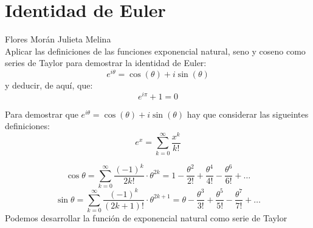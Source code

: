 \documentclass[12pt]{article}
\begin{document}
\section{Identidad de Euler} Flores Morán Julieta Melina \\

Aplicar las definiciones de las funciones exponencial natural, seno y coseno como series de Taylor para demostrar la identidad de Euler:
\[e^{i\theta} = \cos(\theta) + i \sin(\theta)\]
y deducir, de aquí, que:
\[e^{i\pi} + 1 = 0\]

Para demostrar que $e^{i\theta} = \cos(\theta) + i \sin(\theta)$ hay que considerar las sigueintes definiciones:
\[
e^x = \sum_{k=0}^{\infty}\frac{x^{k}}{k!}
\]

\[
\cos\theta = \sum_{k=0}^{\infty}\frac{(-1)^{k}}{2k!} \cdot \theta ^{2k} = 1- \frac{\theta^2}{2!} + \frac{\theta ^4}{4!} -   \frac{\theta^6}{6!} + \ldots
\]
\[
\sin\theta = \sum_{k=0}^{\infty}\frac{(-1)^{k}}{(2k+1)!} \cdot \theta ^{2k+1} =  \theta - \frac{\theta^3}{3!} + \frac{\theta ^5}{5!} -   \frac{\theta^7}{7!} + \ldots
\]
Podemos desarrollar la función de exponencial natural como serie de Taylor
\end{document}
